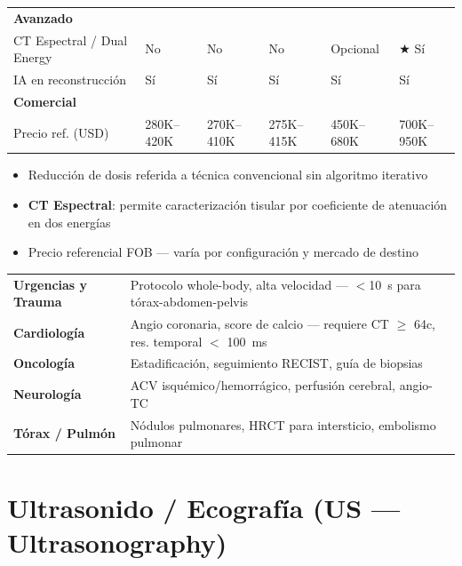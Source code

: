 \documentclass[11pt, a4paper]{article}
\begin{document}
\begin{center}
\begin{tabular}{P{4.2cm} C{2cm} C{2cm} C{2cm} C{2cm} C{2cm}}
\small\textbf{Avanzado} & & & & & \\
CT Espectral / Dual Energy & No & No & No & Opcional & $\bigstar$ Sí \\
IA en reconstrucción       & Sí & Sí & Sí & Sí & Sí \\
\small\textbf{Comercial} & & & & & \\
Precio ref. (USD)          & 280K--420K & 270K--410K & 275K--415K & 450K--680K & 700K--950K \\
\bottomrule
\end{tabular}
\end{center}

\begin{itemize}[leftmargin=*, itemsep=2pt, topsep=4pt]
  \footnotesize
  \item Reducción de dosis referida a técnica convencional sin algoritmo iterativo
  \item \textbf{CT Espectral}: permite caracterización tisular por coeficiente de atenuación en dos energías
  \item Precio referencial FOB — varía por configuración y mercado de destino
\end{itemize}

\begin{clinicbox}
\begin{tabular}{@{}P{3.5cm} P{10cm}@{}}
\textbf{Urgencias y Trauma}  & Protocolo whole-body, alta velocidad --- $<$10~s para tórax-abdomen-pelvis \\[2pt]
\textbf{Cardiología}         & Angio coronaria, score de calcio --- requiere CT $\geq$ 64c, res. temporal $<$ 100~ms \\[2pt]
\textbf{Oncología}           & Estadificación, seguimiento RECIST, guía de biopsias \\[2pt]
\textbf{Neurología}          & ACV isquémico/hemorrágico, perfusión cerebral, angio-TC \\[2pt]
\textbf{Tórax / Pulmón}      & Nódulos pulmonares, HRCT para intersticio, embolismo pulmonar \\
\end{tabular}
\end{clinicbox}

\newpage

\section{Ultrasonido / Ecografía (US --- Ultrasonography)}
\end{document}

